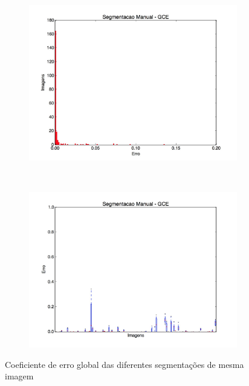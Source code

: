 \begin{figure}[h]
  \centering
  \begin{subfigure}[b]{0.5\textwidth}
    \includegraphics[width=\textwidth]{imgs/manual_gce}
  \end{subfigure}%
  ~
  \begin{subfigure}[b]{0.5\textwidth}
    \includegraphics[width=\textwidth]{imgs/manual_dist_gce}
  \end{subfigure}%
  \caption{Coeficiente de erro global das diferentes segmentações de mesma imagem}
  \label{fig:manual_gce}
\end{figure}

